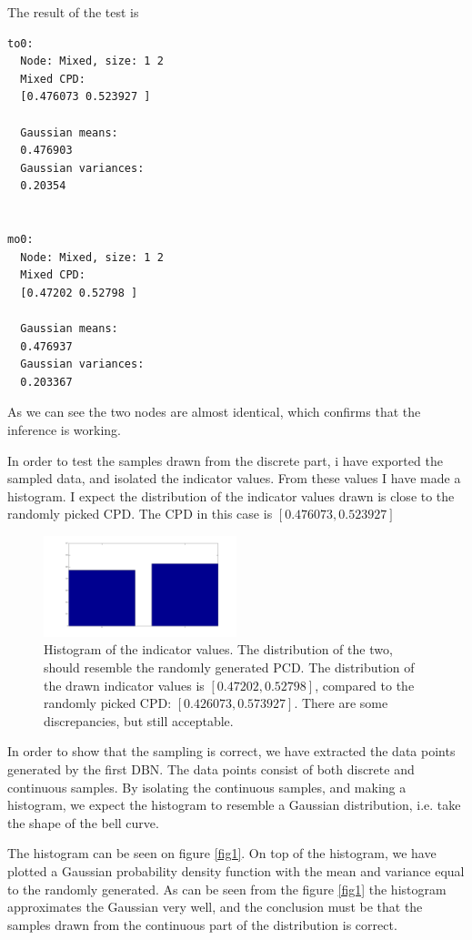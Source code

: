 \documentclass[10pt, journal, compsocconf,a4paper]{IEEEtran}
\begin{document}
The result of the test is

\begin{verbatim}
to0:
  Node: Mixed, size: 1 2 
  Mixed CPD: 
  [0.476073 0.523927 ]

  Gaussian means: 
  0.476903 
  Gaussian variances: 
  0.20354 
  
  
mo0:
  Node: Mixed, size: 1 2 
  Mixed CPD: 
  [0.47202 0.52798 ]

  Gaussian means: 
  0.476937 
  Gaussian variances: 
  0.203367 
\end{verbatim}
As we can see the two nodes are almost identical, which confirms that the inference is working.

In order to test the samples drawn from the discrete part, i have exported the sampled data, and isolated the indicator values. From these values I have made a histogram. I expect the distribution of the indicator values drawn is close to the randomly picked CPD. The CPD in this case is $[0.476073, 0.523927]$

\begin{figure}[ht]
\centering
\includegraphics[width=0.5\textwidth]{figures/fig3.png}                                                                             
\caption{Histogram of the indicator values. The distribution of the two, should resemble the randomly generated PCD. The distribution of the drawn indicator values is $[0.47202,  0.52798]$, compared to the randomly picked CPD: $[0.426073, 0.573927]$. There are some discrepancies, but still acceptable.}
\label{fig3}
\end{figure}


In order to show that the sampling is correct, we have extracted the data points generated by the first DBN. The data points consist of both discrete and continuous samples. By isolating the continuous samples, and making a histogram, we expect the histogram to resemble a Gaussian distribution, i.e. take the shape of the bell curve. 

The histogram can be seen on figure \ref{fig1}. On top of the histogram, we have plotted a Gaussian probability density function with the mean and variance equal to the randomly generated. As can be seen from the figure \ref{fig1} the histogram approximates the Gaussian very well, and the conclusion must be that the samples drawn from the continuous part of the distribution is correct.
\end{document}
